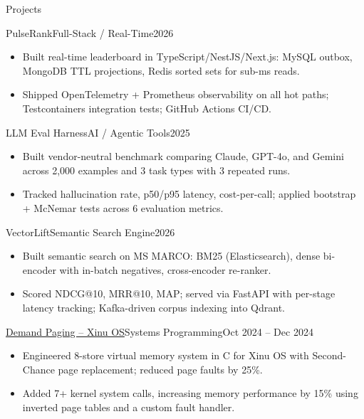 \documentclass[]{mcdowellcv}
\begin{document}
\begin{cvsection}{Projects}
  \begin{cvsubsection}{PulseRank}{Full-Stack / Real-Time}{2026}
    \begin{itemize}
      \item Built real-time leaderboard in TypeScript/NestJS/Next.js: MySQL outbox, MongoDB TTL projections, Redis sorted sets for sub-ms reads.
      \item Shipped OpenTelemetry + Prometheus observability on all hot paths; Testcontainers integration tests; GitHub Actions CI/CD.
    \end{itemize}
    \vspace{-1.5pt}
  \end{cvsubsection}

  \begin{cvsubsection}{LLM Eval Harness}{AI / Agentic Tools}{2025}
    \begin{itemize}
      \item Built vendor-neutral benchmark comparing Claude, GPT-4o, and Gemini across 2,000 examples and 3 task types with 3 repeated runs.
      \item Tracked hallucination rate, p50/p95 latency, cost-per-call; applied bootstrap + McNemar tests across 6 evaluation metrics.
    \end{itemize}
    \vspace{-1.5pt}
  \end{cvsubsection}

  \begin{cvsubsection}{VectorLift}{Semantic Search Engine}{2026}
    \begin{itemize}
      \item Built semantic search on MS MARCO: BM25 (Elasticsearch), dense bi-encoder with in-batch negatives, cross-encoder re-ranker.
      \item Scored NDCG@10, MRR@10, MAP; served via FastAPI with per-stage latency tracking; Kafka-driven corpus indexing into Qdrant.
    \end{itemize}
    \vspace{-1.5pt}
  \end{cvsubsection}

  \begin{cvsubsection}{\href{https://github.com/ncsu-csc-501/project3-mndedhia_akulka26_aapai}{Demand Paging -- Xinu OS}}{Systems Programming}{Oct 2024 -- Dec 2024}
    \begin{itemize}
      \item Engineered 8-store virtual memory system in C for Xinu OS with Second-Chance page replacement; reduced page faults by 25\%.
      \item Added 7+ kernel system calls, increasing memory performance by 15\% using inverted page tables and a custom fault handler.
    \end{itemize}
  \end{cvsubsection}
\end{cvsection}
\end{document}
